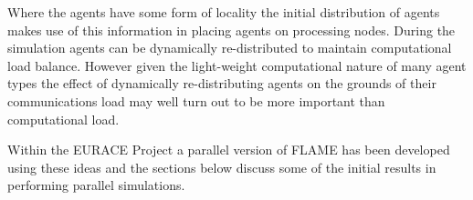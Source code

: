 Where the agents have some form of locality the initial distribution of agents makes use of this information in placing agents on processing nodes. During the simulation agents can be dynamically re-distributed to maintain computational load balance. However given the light-weight computational nature of many agent types the effect of dynamically re-distributing agents on the grounds of their communications load may well turn out to be more important than computational load.

Within the EURACE Project a parallel version of FLAME has been developed using these ideas and the sections below discuss some of the initial results in performing parallel simulations.

